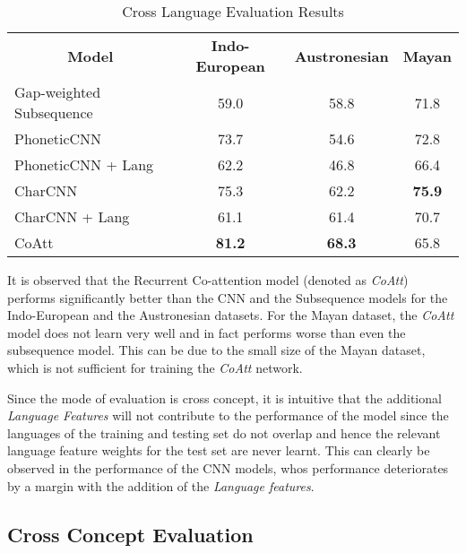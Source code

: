 \documentclass[11pt,letterpaper]{article}
\begin{document}
\begin{table*}[t]
\centering
\begin{tabular}{lccc}
\multicolumn{1}{c}{\textbf{Model}} & \textbf{Indo-European} & \textbf{Austronesian} & \textbf{Mayan} \\
Gap-weighted Subsequence           & 59.0                   & 58.8                  & 71.8           \\
PhoneticCNN                        & 73.7                   & 54.6                  & 72.8           \\
PhoneticCNN + Lang                 & 62.2                   & 46.8                  & 66.4           \\
CharCNN                            & 75.3                   & 62.2                  & \textbf{75.9}           \\
CharCNN + Lang                     & 61.1                   & 61.4                  & 70.7           \\
CoAtt                              & \textbf{81.2}                   & \textbf{68.3}                  & 65.8          
\end{tabular}
\label{CL_res}
\caption{Cross Language Evaluation Results}
\end{table*}

It is observed that the Recurrent Co-attention model (denoted as \textit{CoAtt}) performs significantly better than the CNN and the Subsequence models for the Indo-European and the Austronesian datasets. For the Mayan dataset, the \textit{CoAtt} model does not learn very well and in fact performs worse than even the subsequence model. This can be due to the small size of the Mayan dataset, which is not sufficient for training the \textit{CoAtt} network. 

Since the mode of evaluation is cross concept, it is intuitive that the additional \textit{Language Features} will not contribute to the performance of the model since the languages of the training and testing set do not overlap and hence the relevant language feature weights for the test set are never learnt. This can clearly be observed in the performance of the CNN models, whos performance deteriorates by a margin with the addition of the \textit{Language features}. 

\subsection{Cross Concept Evaluation}
\end{document}
